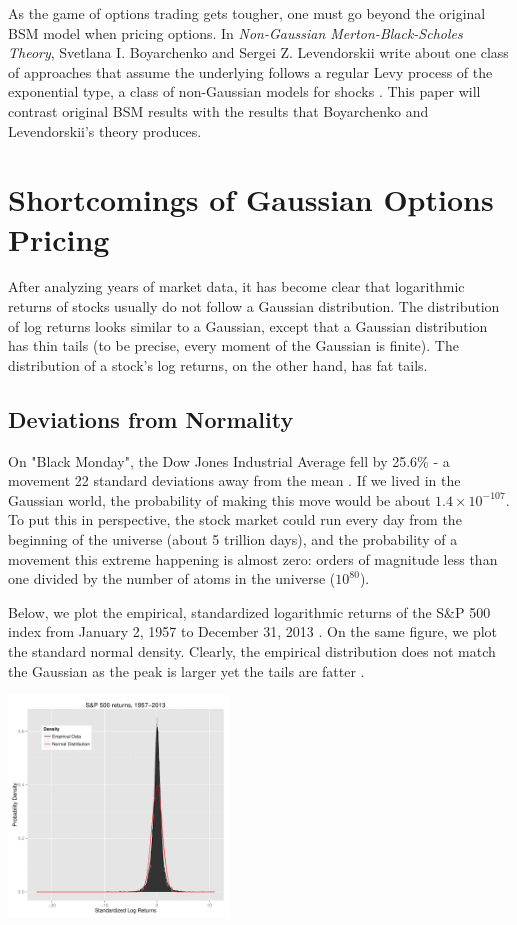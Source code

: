 \documentclass[twoside]{article}
\begin{document}
\begin{multicols}{2}
As the game of options trading gets tougher, one must go beyond the original BSM model when pricing options. In \emph{Non-Gaussian Merton-Black-Scholes Theory}, Svetlana I. Boyarchenko and Sergei Z. Levendorskii write about one class of approaches that assume the underlying follows a regular Levy process of the exponential type, a class of non-Gaussian models for shocks \cite{ngmbs}. This paper will contrast original BSM results with the results that Boyarchenko and Levendorskii's theory produces.


\section{Shortcomings of Gaussian Options Pricing}
After analyzing years of market data, it has become clear that logarithmic returns of stocks usually do not follow a Gaussian distribution. The distribution of log returns looks similar to a Gaussian, except that a Gaussian distribution has thin tails (to be precise, every moment of the Gaussian is finite). The distribution of a stock's log returns, on the other hand, has fat tails.

\subsection{Deviations from Normality}

On "Black Monday", the Dow Jones Industrial Average fell by 25.6\% - a movement 22 standard deviations away from the mean \cite{22sigmas}. If we lived in the Gaussian world, the probability of making this move would be about $1.4 \times 10^{-107}$. To put this in perspective, the stock market could run every day from the beginning of the universe (about 5 trillion days), and the probability of a movement this extreme happening is almost zero: orders of magnitude less than one divided by the number of atoms in the universe ($10^{80}$).

Below, we plot the empirical, standardized logarithmic returns of the S\&P 500 index from January 2, 1957 to December 31, 2013 \cite{yahoofinance}. On the same figure, we plot the standard normal density. Clearly, the empirical distribution does not match the Gaussian as the peak is larger yet the tails are fatter \cite{Rlang} \cite{ggplot2}.

\begin{center}
	\includegraphics[width=0.44\textwidth]{SP500}
\end{center}


\end{multicols}
\end{document}
